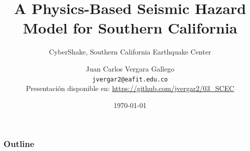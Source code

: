 \documentclass{beamer}
\begin{document}
\title[CyberShake] %
{A Physics-Based Seismic Hazard Model for Southern California}
\subtitle{CyberShake, Southern California Earthquake Center}
\author[Vergara Gallego, Juan Carlos] %
{Juan Carlos Vergara Gallego\\ \texttt{\small jvergar2@eafit.edu.co}\\
{\tiny Presentación disponible en: \url{https://github.com/jvergar2/03_SCEC}}}
\date{\today}
\subject{Ingeniería Sísmica}

\frame{\titlepage}

\begin{frame}
	\frametitle{Outline}
	\tableofcontents
\end{frame}
%
%
\end{document}
